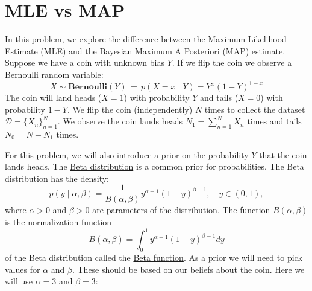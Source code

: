 \documentclass[11pt]{article}
\begin{document}
\section{MLE vs MAP}

In this problem, we explore the difference between the Maximum Likelihood Estimate (MLE) and the Bayesian Maximum A Posteriori (MAP) estimate.
Suppose we have a coin with unknown bias $Y$. 
If we flip the coin we observe a Bernoulli random variable:
\[
X \sim \textbf{Bernoulli}(Y) \, = \, p(X=x \mid Y) = Y^x (1-Y)^{1-x}
\]
The coin will land heads ($X=1$) with probability $Y$ and tails ($X=0$) with probability $1-Y$.
We flip the coin (independently) $N$ times to collect the dataset $\mathcal{D}=\{X_n\}_{n=1}^N$.  We observe the coin lands heads $N_1 = \sum_{n=1}^N X_n$ times and tails $N_0 = N - N_1$ times. 

\vspace{2em}

For this problem, we will also introduce a prior on the probability $Y$ that the coin lands heads.  The \hyperlink{https://en.wikipedia.org/wiki/Beta_distribution}{Beta distribution} is a common prior for probabilities.  The Beta distribution has the density:
\[
p(y\mid \alpha,\beta)=\frac{1}{B(\alpha,\beta)}y^{\alpha-1}(1-y)^{\beta-1},\quad y\in(0,1),
\]
where $\alpha>0$ and $\beta>0$ are parameters of the distribution.  The function $B(\alpha,\beta)$ is the normalization function
\[
B(\alpha, \beta) = \int_{0}^{1}y^{\alpha - 1}(1-y)^{\beta - 1} dy
\]
of the Beta distribution called the  \hyperlink{https://en.wikipedia.org/wiki/Beta_function}{Beta function}.
As a prior we will need to pick values for $\alpha$ and $\beta$.  These should be based on our beliefs about the coin. 
Here we will use $\alpha=3$ and $\beta=3$:
\end{document}

